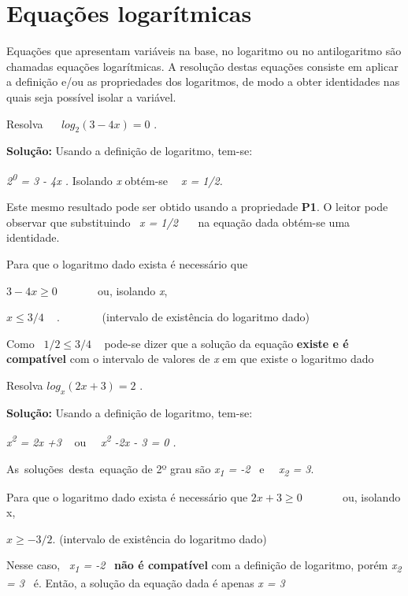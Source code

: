 \section{Equações logarítmicas}

Equações que apresentam variáveis na base, no logaritmo ou no antilogaritmo são chamadas equações logarítmicas. A resolução destas equações consiste em aplicar a definição e/ou as propriedades dos logaritmos, de modo a obter identidades nas quais seja possível isolar a variável.

\begin{texemplo} 
    Resolva~ ~  \( log_{2} \left( 3-4x \right) =0 \) .

    \textbf{Solução: }Usando a definição de logaritmo, tem-se:

    \textit{2\textsuperscript{0} = 3 - 4x . }Isolando \textit{x} obtém-se \textit{~ x = 1/2.}

    Este mesmo resultado pode ser obtido usando a propriedade \textbf{P1}. O leitor pode observar que substituindo~ \textit{x = 1/2}~~~ na equação dada obtém-se uma identidade.

    Para que o logaritmo dado exista é necessário que

    \( 3-4x \geq 0 \) ~~~~~~ ou, isolando \textit{x},

    \( x \leq 3/4 \) ~ .~~~~~~~ (intervalo de existência do logaritmo dado)

    Como~  \( 1/2 \leq 3/4 \) ~ pode-se dizer que a solução da equação \textbf{existe e é compatível} com o intervalo de valores de \textit{x} em que existe o logaritmo dado \qedsymbol{}
\end{texemplo}

\begin{texemplo}
    Resolva \( log_{x} \left( 2x+3 \right) =2 \) .

    \textbf{Solução: }Usando a definição de logaritmo, tem-se:

    \textit{x\textsuperscript{2} = 2x +3 ~ }ou~~ \textit{x\textsuperscript{2} -2x - 3 = 0  .}

    As~soluções~desta~equação de 2º grau são    \textit{x\textsubscript{1} = -2}~ e~~ \textit{x\textsubscript{2} = 3}. 

    Para que o logaritmo dado exista é necessário que
    \quad  \( 2x+3 \geq 0 \) ~~~~~~ ou, isolando x,

    \( x \geq -3/2. \) \quad (intervalo de existência do logaritmo dado)
    
    Nesse caso,~ \textit{x\textsubscript{1} = -2}~ \textbf{não é compatível} com a definição de logaritmo, porém \textit{x\textsubscript{2} = 3~ } é. Então, a solução da equação dada é apenas \textit{x = 3} \qedsymbol{}~ ~~~~~~ \textit{~~ }

\end{texemplo}

